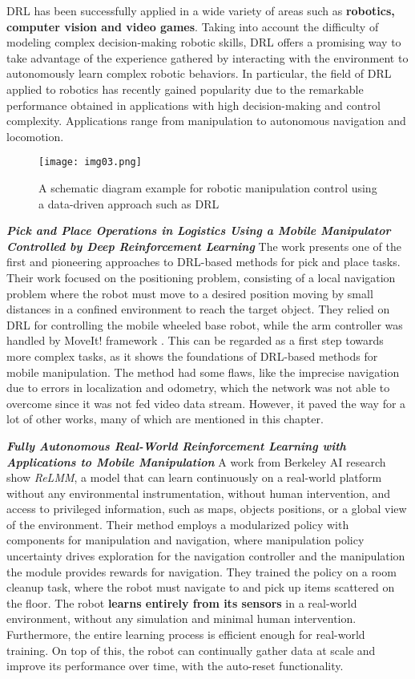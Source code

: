 DRL has been successfully applied in a wide variety of areas such as \textbf{robotics, computer vision and video games}.
Taking into account the difficulty of modeling complex decision-making robotic skills, DRL offers
a promising way to take advantage of the experience gathered by interacting with the environment to
autonomously learn complex robotic behaviors. In particular, the field of DRL applied to robotics has
recently gained popularity due to the remarkable performance obtained in applications
with high decision-making and control complexity.
Applications range from manipulation to autonomous navigation and locomotion.
\cite{iriondo2023learning}

\begin{figure}[ht]
	\centering
	\texttt{[image: img03.png]}
	\captionsetup{width=0.8\linewidth}
	\caption{A schematic diagram example for robotic manipulation control
		using a data-driven approach such as DRL \cite{liu2021deep}}
	\label{fig:img03}
\end{figure}

\textbf{\textit{Pick and Place Operations in Logistics Using
		a Mobile Manipulator Controlled by Deep
		Reinforcement Learning}} \quad
The work \cite{iriondo2019pickandplace} presents one of the first and pioneering approaches
to DRL-based methods for pick and place tasks. Their work focused on the positioning
problem, consisting of a local navigation problem where the robot must move to a desired
position moving by small distances in a confined environment to reach the target object.
They relied on DRL for controlling the mobile wheeled base robot, while the arm controller
was handled by MoveIt! framework \cite{moveit2}. This can be regarded as a first step towards
more complex tasks, as it shows the foundations of DRL-based methods for mobile manipulation.
The method had some flaws, like the imprecise navigation due to errors in localization and
odometry, which the network was not able to overcome since it was not fed video data stream.
However, it paved the way for a lot of other works, many of which are mentioned in this chapter.

\textbf{\textit{Fully Autonomous Real-World Reinforcement
		Learning with Applications to Mobile Manipulation}} \quad
A work from Berkeley AI research \cite{sun2022relmm} show \textit{ReLMM}, a model that
can learn continuously on a real-world platform without any environmental instrumentation,
without human intervention, and access to privileged information, such as maps,
objects positions, or a global view of the environment. Their method employs a modularized policy
with components for manipulation and navigation, where manipulation
policy uncertainty drives exploration for the navigation controller and the manipulation
the module provides rewards for navigation. They trained the policy on a room cleanup task, where
the robot must navigate to and pick up items scattered on the floor.
The robot \textbf{learns entirely from its sensors} in a real-world environment, without any
simulation and minimal human intervention. Furthermore, the entire learning process is efficient
enough for real-world training. On top of this, the robot can continually gather data
at scale and improve its performance over time, with the auto-reset functionality.

